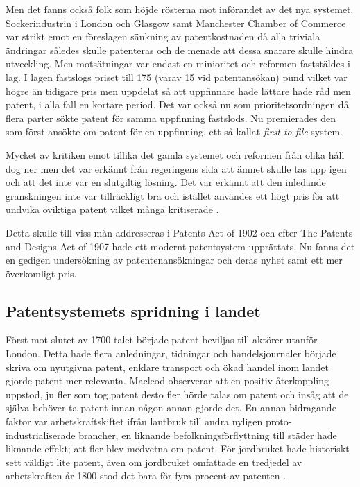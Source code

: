 Men det fanns också folk som höjde rösterna mot införandet av det nya systemet. Sockerindustrin i London och Glasgow samt Manchester Chamber of Commerce var strikt emot en föreslagen sänkning av patentkostnaden då alla triviala ändringar således skulle patenteras och de menade att dessa snarare skulle hindra utveckling\cite{dutton}. Men motsätningar var endast en minioritet och reformen faststäldes i lag. I lagen fastslogs priset till 175 (varav 15 vid patentansökan) pund vilket var högre än tidigare pris men uppdelat så att uppfinnare hade lättare hade råd men patent, i alla fall en kortare period\cite{dutton}. Det var också nu som prioritetsordningen då flera parter sökte patent för samma uppfinning fastslods. Nu premierades den som först ansökte om patent för en uppfinning, ett så kallat \emph{first to file} system\cite{webster}.


Mycket av kritiken emot tillika det gamla systemet och reformen från olika håll dog ner men det var erkännt från regeringens sida att ämnet skulle tas upp igen och att det inte var en slutgiltig lösning\cite{dutton}. Det var erkännt att den inledande granskningen inte var tillräckligt bra och istället användes ett högt pris för att undvika oviktiga patent vilket många kritiserade \cite{dutton}.

Detta skulle till viss mån addresseras i Patents Act of 1902 och efter The Patents 
and Designs Act of 1907 hade ett modernt patentsystem upprättats. Nu fanns det en gedigen undersökning av patentenansökningar och deras nyhet samt ett mer överkomligt pris\cite{macleod}.







\subsection{Patentsystemets spridning i landet}

Först mot slutet av 1700-talet började patent beviljas till aktörer utanför London. Detta hade flera
anledningar, tidningar och handelsjournaler började skriva om nyutgivna patent, enklare transport och
ökad handel inom landet gjorde patent mer relevanta\cite{macleod}. Macleod observerar att en positiv återkoppling uppstod, ju fler som tog
patent desto fler hörde talas om patent och insåg att de själva behöver ta patent innan någon annan gjorde
det. En annan bidragande faktor var arbetskraftskiftet ifrån lantbruk till andra nyligen
proto-industrialiserade brancher, en liknande befolkningsförflyttning till städer hade liknande effekt;
att fler blev medvetna om patent\cite{macleod}. För jordbruket hade historiskt sett väldigt lite patent, även om
jordbruket omfattade en tredjedel av arbetskraften år 1800 stod det bara för fyra procent av patenten
\cite{macleod2}.

